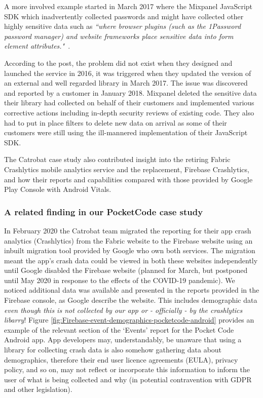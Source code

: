 A more involved example started in March 2017 where the Mixpanel JavaScript SDK which inadvertently collected passwords and might have collected other highly sensitive data such as \emph{``where browser plugins (such as the 1Password password manager) and website frameworks place sensitive data into form element attributes."}~\cite{mcclintok_mixpanel_update_on_autotrack_data_collection}. 

According to the post, the problem did not exist when they designed and launched the service in 2016, it was triggered when they updated the version of an external and well regarded library in March 2017. The issue was discovered and reported by a customer in January 2018. Mixpanel deleted the sensitive data their library had collected on behalf of their customers and implemented various corrective actions including in-depth security reviews of existing code. They also had to put in place filters to delete new data on arrival as some of their customers were still using the ill-mannered implementation of their JavaScript SDK. %

The Catrobat case study also contributed insight into the retiring Fabric Crashlytics mobile analytics service and the replacement, Firebase Crashlytics, and how their reports and capabilities compared with those provided by Google Play Console with Android Vitals.

\subsubsection{A related finding in our PocketCode case study}
In February 2020 the Catrobat team migrated the reporting for their app crash analytics (Crashlytics) from the Fabric website to the Firebase website using an inbuilt migration tool provided by Google who own both services. The migration meant the app's crash data could be viewed in both these websites independently until Google disabled the Firebase website (planned for March, but postponed until  May 2020 in response to the effects of the COVID-19 pandemic).  We noticed additional data was available and presented in the reports provided in the Firebase console, as Google describe the website. This includes demographic data \emph{even though this is not collected by our app or - officially - by the crashlytics libarry}! Figure \ref{fig:Firebase-event-demographics-pocketcode-android} provides an example of the relevant section of the `Events' report for the Pocket Code Android app. App developers may, understandably, be unaware that using a library for collecting crash data is also somehow gathering data about demographics, therefore their end user licence agreements (EULA), privacy policy, and so on, may not reflect or incorporate this information to inform the user of what is being collected and why (in potential contravention with GDPR and other legislation).

